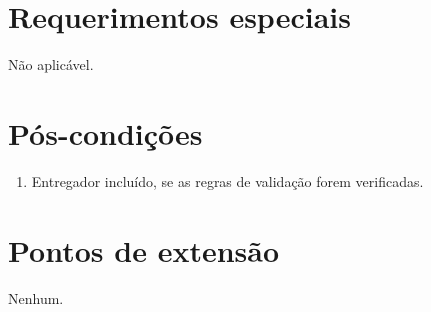 \section{Requerimentos especiais}

Não aplicável.

\section{Pós-condições}

\begin{enumerate}
	\item Entregador incluído, se as regras de validação forem verificadas.
\end{enumerate}

\section{Pontos de extensão}

Nenhum.